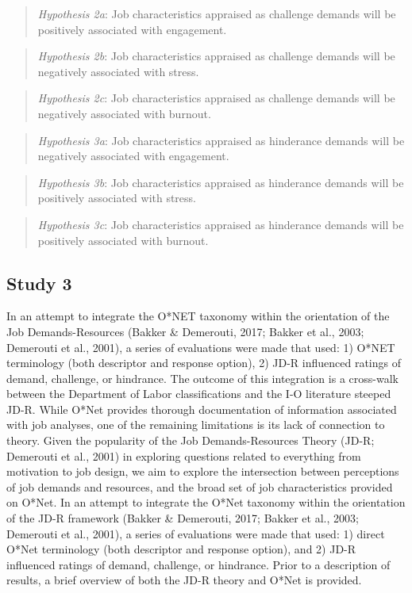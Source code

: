 \documentclass[
  english,
  man]{apa6}
\begin{document}
\begin{quote}
\emph{Hypothesis 2a}: Job characteristics appraised as challenge demands will be positively associated with engagement.
\end{quote}

\begin{quote}
\emph{Hypothesis 2b}: Job characteristics appraised as challenge demands will be negatively associated with stress.
\end{quote}

\begin{quote}
\emph{Hypothesis 2c}: Job characteristics appraised as challenge demands will be negatively associated with burnout.
\end{quote}

\begin{quote}
\emph{Hypothesis 3a}: Job characteristics appraised as hinderance demands will be negatively associated with engagement.
\end{quote}

\begin{quote}
\emph{Hypothesis 3b}: Job characteristics appraised as hinderance demands will be positively associated with stress.
\end{quote}

\begin{quote}
\emph{Hypothesis 3c}: Job characteristics appraised as hinderance demands will be positively associated with burnout.
\end{quote}

\hypertarget{study-3}{%
\subsection{Study 3}\label{study-3}}

In an attempt to integrate the O*NET taxonomy within the orientation of the Job Demands-Resources (Bakker \& Demerouti, 2017; Bakker et al., 2003; Demerouti et al., 2001), a series of evaluations were made that used: 1) O*NET terminology (both descriptor and response option), 2) JD-R influenced ratings of demand, challenge, or hindrance. The outcome of this integration is a cross-walk between the Department of Labor classifications and the I-O literature steeped JD-R. While O*Net provides thorough documentation of information associated with job analyses, one of the remaining limitations is its lack of connection to theory. Given the popularity of the Job Demands-Resources Theory (JD-R; Demerouti et al., 2001) in exploring questions related to everything from motivation to job design, we aim to explore the intersection between perceptions of job demands and resources, and the broad set of job characteristics provided on O*Net. In an attempt to integrate the O*Net taxonomy within the orientation of the JD-R framework (Bakker \& Demerouti, 2017; Bakker et al., 2003; Demerouti et al., 2001), a series of evaluations were made that used: 1) direct O*Net terminology (both descriptor and response option), and 2) JD-R influenced ratings of demand, challenge, or hindrance. Prior to a description of results, a brief overview of both the JD-R theory and O*Net is provided.
\end{document}
